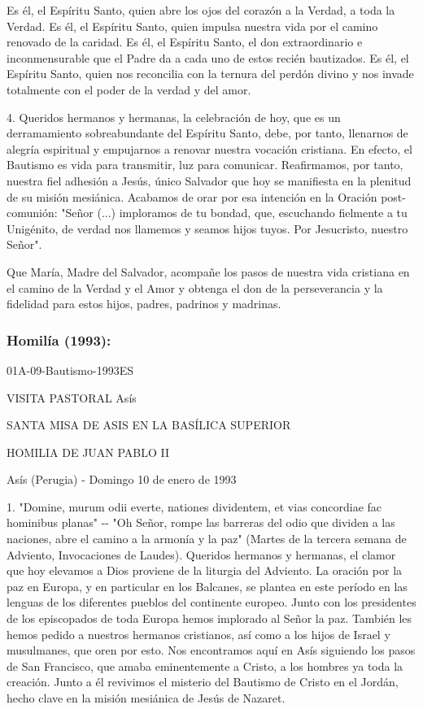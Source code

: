 \begin{body}
Es él, el Espíritu Santo, quien abre los ojos del corazón a la Verdad, a toda la Verdad. Es él, el Espíritu Santo, quien impulsa nuestra vida por el camino renovado de la caridad. Es él, el Espíritu Santo, el don extraordinario e inconmensurable que el Padre da a cada uno de estos recién bautizados. Es él, el Espíritu Santo, quien nos reconcilia con la ternura del perdón divino y nos invade totalmente con el poder de la verdad y del amor.

4. Queridos hermanos y hermanas, la celebración de hoy, que es un derramamiento sobreabundante del Espíritu Santo, debe, por tanto, llenarnos de alegría espiritual y empujarnos a renovar nuestra vocación cristiana. En efecto, el Bautismo es vida para transmitir, luz para comunicar. Reafirmamos, por tanto, nuestra fiel adhesión a Jesús, único Salvador que hoy se manifiesta en la plenitud de su misión mesiánica. Acabamos de orar por esa intención en la Oración post-comunión: "Señor (...) imploramos de tu bondad, que, escuchando fielmente a tu Unigénito, de verdad nos llamemos y seamos hijos tuyos. Por Jesucristo, nuestro Señor".

Que María, Madre del Salvador, acompañe los pasos de nuestra vida cristiana en el camino de la Verdad y el Amor y obtenga el don de la perseverancia y la fidelidad para estos hijos, padres, padrinos y madrinas.

\subsubsection{Homilía (1993): } 01A-09-Bautismo-1993ES

VISITA PASTORAL Asís

SANTA MISA DE ASIS EN LA BASÍLICA SUPERIOR

HOMILIA DE JUAN PABLO II

Asís (Perugia) - Domingo 10 de enero de 1993

1. "Domine, murum odii everte, nationes dividentem, et vias concordiae fac hominibus planas" -\/- "Oh Señor, rompe las barreras del odio que dividen a las naciones, abre el camino a la armonía y la paz" (Martes de la tercera semana de Adviento, Invocaciones de Laudes). Queridos hermanos y hermanas, el clamor que hoy elevamos a Dios proviene de la liturgia del Adviento. La oración por la paz en Europa, y en particular en los Balcanes, se plantea en este período en las lenguas de los diferentes pueblos del continente europeo. Junto con los presidentes de los episcopados de toda Europa hemos implorado al Señor la paz. También les hemos pedido a nuestros hermanos cristianos, así como a los hijos de Israel y musulmanes, que oren por esto. Nos encontramos aquí en Asís siguiendo los pasos de San Francisco, que amaba eminentemente a Cristo, a los hombres ya toda la creación. Junto a él revivimos el misterio del Bautismo de Cristo en el Jordán, hecho clave en la misión mesiánica de Jesús de Nazaret.


\end{body}

